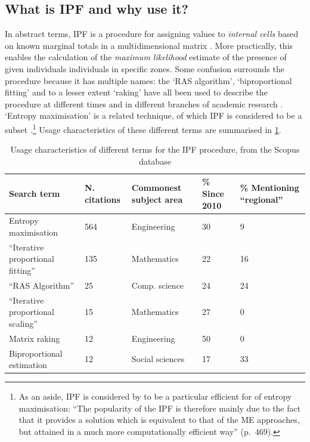 \documentclass[a4paper,10pt]{article}
\begin{document}
\subsection{What is IPF and why use it?} 
\label{swhatis}

In abstract terms, IPF is a procedure for assigning values to \emph{internal cells}
based on known marginal totals in a multidimensional matrix \citep{Cleave1995}.
More practically, this enables the calculation of the
\emph{maximum likelihood} estimate of the presence of
given individuals individuals in specific zones.
Some confusion surrounds the procedure because it has multiple names:
the `RAS algorithm', `biproportional fitting' and to a lesser extent
`raking' have all been used to describe the procedure
at different times and in different branches of academic research \citep{Lahr2004}.
`Entropy maximisation' is a related technique, of which IPF is considered to be a
subset \citep{Johnston1993,Rich2012}.\footnote{As an
aside, IPF is considered by \citet{Rich2012} to be a particular
efficient for of entropy maximisation: ``The popularity of the IPF is therefore mainly due to the fact that it provides a
solution which is equivalent to that of the ME approaches, but attained in a much more
computationally efficient way'' (p.~469).
}
Usage characteristics of these different terms are summarised in \cref{tterms}.

\begin{table}[htbp]
\caption{Usage characteristics of different terms for the IPF procedure, from the Scopus database}
\begin{tabular}{lp{1.5cm}p{2.5cm}p{1.5cm}p{2.5cm}}
\toprule
Search term & N. citations & Commonest subject area & \% Since 2010 & \% Mentioning ``regional'' \\
\midrule
Entropy maximisation & 564 & Engineering & 30 & 9 \\
``Iterative proportional fitting''  & 135 & Mathematics & 22\ & 16 \\
``RAS Algorithm'' & 25 & Comp. science & 24 & 24 \\
``Iterative proportional scaling'' & 15 & Mathematics & 27 & 0 \\
Matrix raking & 12 & Engineering & 50 & 0 \\
Biproportional estimation & 12 & Social sciences & 17 & 33 \\
\bottomrule
\end{tabular}
\label{tterms}
\end{table}
\end{document}
